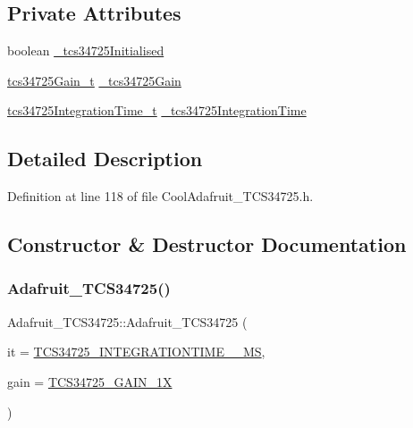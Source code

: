 \subsection*{Private Attributes}
\begin{DoxyCompactItemize}
\item 
boolean \hyperlink{class_adafruit___t_c_s34725_ae9368bc77b501044f034d5d9ad3266ba}{\+\_\+tcs34725\+Initialised}
\item 
\hyperlink{_cool_adafruit___t_c_s34725_8h_a23611ba111ac38012551332ee7189f9a}{tcs34725\+Gain\+\_\+t} \hyperlink{class_adafruit___t_c_s34725_ae614cd13b99a10b8e05ec78cab05c700}{\+\_\+tcs34725\+Gain}
\item 
\hyperlink{_cool_adafruit___t_c_s34725_8h_a09f4624f70b21f0ec2526dbaedb5895e}{tcs34725\+Integration\+Time\+\_\+t} \hyperlink{class_adafruit___t_c_s34725_afbfddd381324226265955f436c82efd3}{\+\_\+tcs34725\+Integration\+Time}
\end{DoxyCompactItemize}


\subsection{Detailed Description}


Definition at line 118 of file Cool\+Adafruit\+\_\+\+T\+C\+S34725.\+h.



\subsection{Constructor \& Destructor Documentation}
\mbox{\label{class_adafruit___t_c_s34725_a2dd194daed0f6813b4e38f453e565572}} 
\subsubsection{\texorpdfstring{Adafruit\+\_\+\+T\+C\+S34725()}{Adafruit\_TCS34725()}}
{\footnotesize\ttfamily Adafruit\+\_\+\+T\+C\+S34725\+::\+Adafruit\+\_\+\+T\+C\+S34725 (\begin{DoxyParamCaption}\item[{\hyperlink{_cool_adafruit___t_c_s34725_8h_a09f4624f70b21f0ec2526dbaedb5895e}{tcs34725\+Integration\+Time\+\_\+t}}]{it = {\ttfamily \hyperlink{_cool_adafruit___t_c_s34725_8h_a09f4624f70b21f0ec2526dbaedb5895ea6568fa807d0d8a5eb73c7a8a5aed767c}{T\+C\+S34725\+\_\+\+I\+N\+T\+E\+G\+R\+A\+T\+I\+O\+N\+T\+I\+M\+E\+\_\+\_\+MS}},  }\item[{\hyperlink{_cool_adafruit___t_c_s34725_8h_a23611ba111ac38012551332ee7189f9a}{tcs34725\+Gain\+\_\+t}}]{gain = {\ttfamily \hyperlink{_cool_adafruit___t_c_s34725_8h_a23611ba111ac38012551332ee7189f9aae1a2aedc525bdbeefa83efdf1e6bdafa}{T\+C\+S34725\+\_\+\+G\+A\+I\+N\+\_\+1X}} }\end{DoxyParamCaption})}

